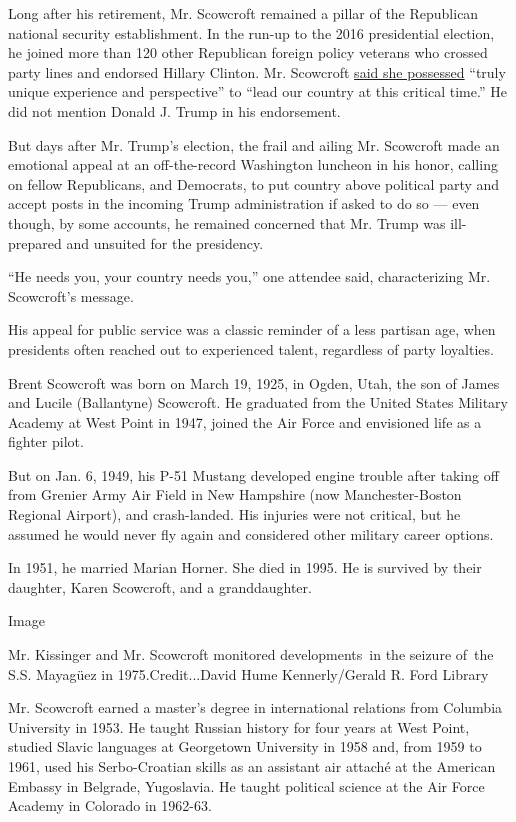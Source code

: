 Long after his retirement, Mr. Scowcroft remained a pillar of the
Republican national security establishment. In the run-up to the 2016
presidential election, he joined more than 120 other Republican foreign
policy veterans who crossed party lines and endorsed Hillary Clinton.
Mr. Scowcroft
\href{https://time.com/4378850/brent-scowcroft-hillary-clinton-donald-trump/}{said
she possessed} ``truly unique experience and perspective'' to ``lead our
country at this critical time.'' He did not mention Donald J. Trump in
his endorsement.

But days after Mr. Trump's election, the frail and ailing Mr. Scowcroft
made an emotional appeal at an off-the-record Washington luncheon in his
honor, calling on fellow Republicans, and Democrats, to put country
above political party and accept posts in the incoming Trump
administration if asked to do so --- even though, by some accounts, he
remained concerned that Mr. Trump was ill-prepared and unsuited for the
presidency.

``He needs you, your country needs you,'' one attendee said,
characterizing Mr. Scowcroft's message.

His appeal for public service was a classic reminder of a less partisan
age, when presidents often reached out to experienced talent, regardless
of party loyalties.

Brent Scowcroft was born on March 19, 1925, in Ogden, Utah, the son of
James and Lucile (Ballantyne) Scowcroft. He graduated from the United
States Military Academy at West Point in 1947, joined the Air Force and
envisioned life as a fighter pilot.

But on Jan. 6, 1949, his P-51 Mustang developed engine trouble after
taking off from Grenier Army Air Field in New Hampshire (now
Manchester-Boston Regional Airport), and crash-landed. His injuries were
not critical, but he assumed he would never fly again and considered
other military career options.

In 1951, he married Marian Horner. She died in 1995. He is survived by
their daughter, Karen Scowcroft, and a granddaughter.

Image

Mr. Kissinger and Mr. Scowcroft monitored developments~in the seizure
of~the S.S. Mayagüez in 1975.Credit...David Hume Kennerly/Gerald R. Ford
Library

Mr. Scowcroft earned a master's degree in international relations from
Columbia University in 1953. He taught Russian history for four years at
West Point, studied Slavic languages at Georgetown University in 1958
and, from 1959 to 1961, used his Serbo-Croatian skills as an assistant
air attaché at the American Embassy in Belgrade, Yugoslavia. He taught
political science at the Air Force Academy in Colorado in 1962-63.


